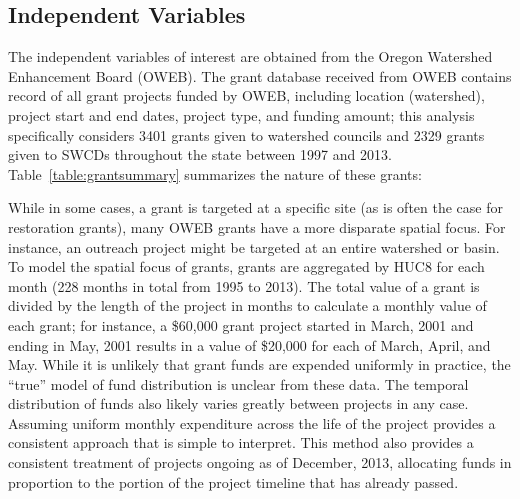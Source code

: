 \documentclass[12pt,a4paper,titlepage]{article}
\begin{document}
\subsection*{Independent Variables}

The independent variables of interest are obtained from the Oregon Watershed Enhancement Board (OWEB). The grant database received from OWEB contains record of all grant projects funded by OWEB, including location (watershed), project start and end dates, project type, and funding amount; this analysis specifically considers 3401 grants given to watershed councils and 2329 grants given to SWCDs throughout the state between 1997 and 2013. Table~\ref{table:grantsummary} summarizes the nature of these grants:



While in some cases, a grant is targeted at a specific site (as is often the case for restoration grants), many OWEB grants have a more disparate spatial focus. For instance, an outreach project might be targeted at an entire watershed or basin. To model the spatial focus of grants, grants are aggregated by HUC8 for each month (228 months in total from 1995 to 2013). The total value of a grant is divided by the length of the project in months to calculate a monthly value of each grant; for instance, a \$60,000 grant project started in March, 2001 and ending in May, 2001 results in a value of \$20,000 for each of March, April, and May. While it is unlikely that grant funds are expended uniformly in practice, the “true” model of fund distribution is unclear from these data. The temporal distribution of funds also likely varies greatly between projects in any case. Assuming uniform monthly expenditure across the life of the project provides a consistent approach that is simple to interpret. This method also provides a consistent treatment of projects ongoing as of December, 2013, allocating funds in proportion to the portion of the project timeline that has already passed.
\end{document}
